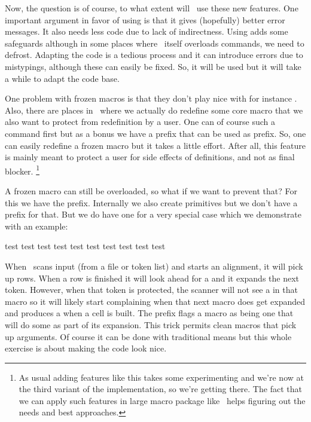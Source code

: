 Now, the question is of course, to what extent will \CONTEXT\ use these new
features. One important argument in favor of using \type {\tolerant} is that it
gives (hopefully) better error messages. It also needs less code due to lack of
indirectness. Using \type {\frozen} adds some safeguards although in some places
where \CONTEXT\ itself overloads commands, we need to defrost. Adapting the code
is a tedious process and it can introduce errors due to mistypings, although
these can easily be fixed. So, it will be used but it will take a while to adapt
the code base.

One problem with frozen macros is that they don't play nice with for instance
\type {\futurelet}. Also, there are places in \CONTEXT\ where we actually do
redefine some core macro that we also want to protect from redefinition by a
user. One can of course \type {\unletfrozen} such a command first but as a bonus
we have a prefix \type {\overloaded} that can be used as prefix. So, one can easily
redefine a frozen macro but it takes a little effort. After all, this feature is
mainly meant to protect a user for side effects of definitions, and not as final
blocker. \footnote {As usual adding features like this takes some experimenting
and we're now at the third variant of the implementation, so we're getting there.
The fact that we can apply such features in large macro package like \CONTEXT\
helps figuring out the needs and best approaches.}

A frozen macro can still be overloaded, so what if we want to prevent that? For
this we have the \type {\permanent} prefix. Internally we also create primitives
but we don't have a prefix for that. But we do have one for a very special case
which we demonstrate with an example:

\startbuffer[example]
\def\FOO %
  {\noalign{\vskip10pt}}

\noaligned\protected\tolerant{}

\starttabulate[|l|l|]
    \NC test \NC test \NC \NR
    \NC test \NC test \NC \NR
    \FOO
    \NC test \NC test \NC \NR
    \OOF[30pt]
    \NC test \NC test \NC \NR
    \OOF
    \NC test \NC test \NC \NR
\stoptabulate
\stopbuffer

\typebuffer[example][option=TEX]

When \TEX\ scans input (from a file or token list) and starts an alignment, it
will pick up rows. When a row is finished it will look ahead for a \type
{\noalign} and it expands the next token. However, when that token is protected,
the scanner will not see a \type {\noalign} in that macro so it will likely start
complaining when that next macro does get expanded and produces a \type
{\noalign} when a cell is built. The \type {\noaligned} prefix flags a macro as
being one that will do some \type {\noalign} as part of its expansion. This trick
permits clean macros that pick up arguments. Of course it can be done with
traditional means but this whole exercise is about making the code look nice.

